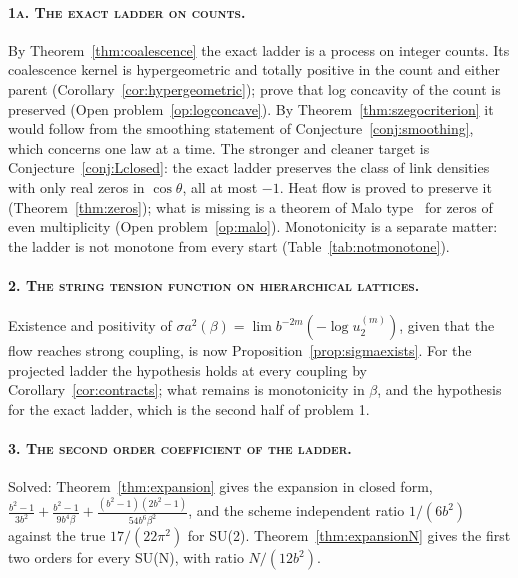 \paragraph{\normalfont\scshape 1a. The exact ladder on counts.} By Theorem~\ref{thm:coalescence} the exact ladder is a process on integer counts. Its coalescence kernel is hypergeometric and totally positive in the count and either parent (Corollary~\ref{cor:hypergeometric}); prove that log concavity of the count is preserved (Open problem~\ref{op:logconcave}). By Theorem~\ref{thm:szegocriterion} it would follow from the smoothing statement of Conjecture~\ref{conj:smoothing}, which concerns one law at a time. The stronger and cleaner target is Conjecture~\ref{conj:Lclosed}: the exact ladder preserves the class of link densities with only real zeros in $\cos\theta$, all at most $-1$. Heat flow is proved to preserve it (Theorem~\ref{thm:zeros}); what is missing is a theorem of Malo type~\cite{Malo} for zeros of even multiplicity (Open problem~\ref{op:malo}). Monotonicity is a separate matter: the ladder is not monotone from every start (Table~\ref{tab:notmonotone}).

\paragraph{\normalfont\scshape 2. The string tension function on hierarchical lattices.} Existence and positivity of $\sigma a^2(\beta)=\lim b^{-2m}(-\log u_2^{(m)})$, given that the flow reaches strong coupling, is now Proposition~\ref{prop:sigmaexists}. For the projected ladder the hypothesis holds at every coupling by Corollary~\ref{cor:contracts}; what remains is monotonicity in $\beta$, and the hypothesis for the exact ladder, which is the second half of problem 1.

\paragraph{\normalfont\scshape 3. The second order coefficient of the ladder.} Solved: Theorem~\ref{thm:expansion} gives the expansion in closed form, $\frac{b^2-1}{3b^2}+\frac{b^2-1}{9b^4\beta}+\frac{(b^2-1)(2b^2-1)}{54b^6\beta^2}$, and the scheme independent ratio $1/(6b^2)$ against the true $17/(22\pi^2)$ for SU(2). Theorem~\ref{thm:expansionN} gives the first two orders for every SU(N), with ratio $N/(12b^2)$.

